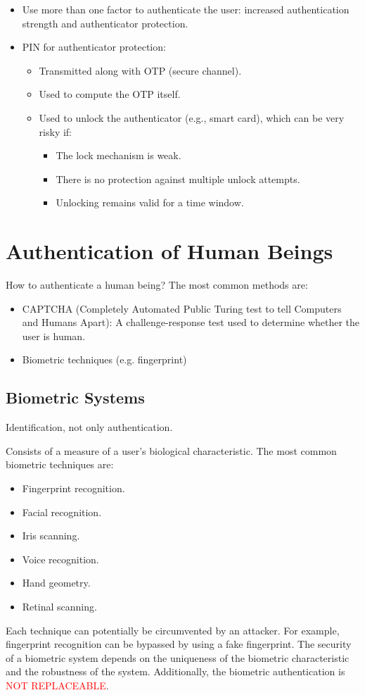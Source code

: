 \begin{itemize}
    \item Use more than one factor to authenticate the user: increased authentication strength and authenticator protection.
    \item PIN for authenticator protection:
    \begin{itemize}
        \item Transmitted along with OTP (secure channel).
        \item Used to compute the OTP itself.
        \item Used to unlock the authenticator (e.g., smart card), which can be very risky if:
        \begin{itemize}
            \item The lock mechanism is weak.
            \item There is no protection against multiple unlock attempts.
            \item Unlocking remains valid for a time window.
        \end{itemize}
    \end{itemize}
\end{itemize}
\section{Authentication of Human Beings}
How to authenticate a human being? The most common methods are:
\begin{itemize}
    \item CAPTCHA (Completely Automated Public Turing test to tell Computers and Humans Apart): A challenge-response test used to determine whether the user is human.
    \item Biometric techniques (e.g. fingerprint)
\end{itemize}

\subsection{Biometric Systems}
\begin{center}
    Identification, not only authentication.
\end{center}
Consists of a measure of a user's biological characteristic. The most common biometric techniques are: 
\begin{itemize}
    \item Fingerprint recognition.
    \item Facial recognition.
    \item Iris scanning.
    \item Voice recognition.
    \item Hand geometry.
    \item Retinal scanning.
\end{itemize}
Each technique can potentially be circumvented by an attacker. For example, fingerprint recognition can be bypassed by using a fake fingerprint. The security of a biometric system depends on the uniqueness of the biometric characteristic and the robustness of the system. Additionally, the biometric authentication is \textcolor{Red}{NOT REPLACEABLE}.

